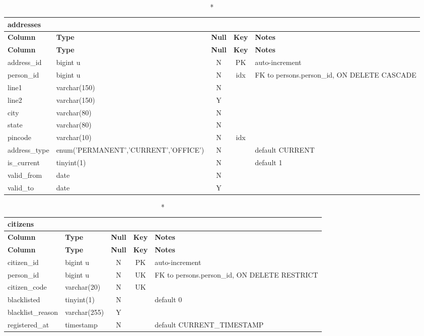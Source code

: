 \begin{longtable}{@{}p{3.4cm}p{2.9cm}c c p{5.6cm}@{}}
\caption*{\textbf{addresses}}\\
\toprule \textbf{Column} & \textbf{Type} & \textbf{Null} & \textbf{Key} & \textbf{Notes} \\ \midrule \endfirsthead
\toprule \textbf{Column} & \textbf{Type} & \textbf{Null} & \textbf{Key} & \textbf{Notes} \\ \midrule \endhead
\bottomrule \endlastfoot
address\_\allowbreak{}id & bigint u & N & PK & auto-increment \\
person\_\allowbreak{}id & bigint u & N & idx & FK to persons.person\_\allowbreak{}id, ON DELETE CASCADE \\
line1 & varchar(150) & N &  &  \\
line2 & varchar(150) & Y &  &  \\
city & varchar(80) & N &  &  \\
state & varchar(80) & N &  &  \\
pincode & varchar(10) & N & idx &  \\
address\_\allowbreak{}type & enum('PERMANENT',\allowbreak{}'CURRENT',\allowbreak{}'OFFICE') & N &  & default CURRENT \\
is\_\allowbreak{}current & tinyint(1) & N &  & default 1 \\
valid\_\allowbreak{}from & date & N &  &  \\
valid\_\allowbreak{}to & date & Y &  &  \\
\end{longtable}
\vspace{-0.4em}
\begin{longtable}{@{}p{3.4cm}p{2.9cm}c c p{5.6cm}@{}}
\caption*{\textbf{citizens}}\\
\toprule \textbf{Column} & \textbf{Type} & \textbf{Null} & \textbf{Key} & \textbf{Notes} \\ \midrule \endfirsthead
\toprule \textbf{Column} & \textbf{Type} & \textbf{Null} & \textbf{Key} & \textbf{Notes} \\ \midrule \endhead
\bottomrule \endlastfoot
citizen\_\allowbreak{}id & bigint u & N & PK & auto-increment \\
person\_\allowbreak{}id & bigint u & N & UK & FK to persons.person\_\allowbreak{}id, ON DELETE RESTRICT \\
citizen\_\allowbreak{}code & varchar(20) & N & UK &  \\
blacklisted & tinyint(1) & N &  & default 0 \\
blacklist\_\allowbreak{}reason & varchar(255) & Y &  &  \\
registered\_\allowbreak{}at & timestamp & N &  & default CURRENT\_\allowbreak{}TIMESTAMP \\
\end{longtable}
\vspace{-0.4em}
